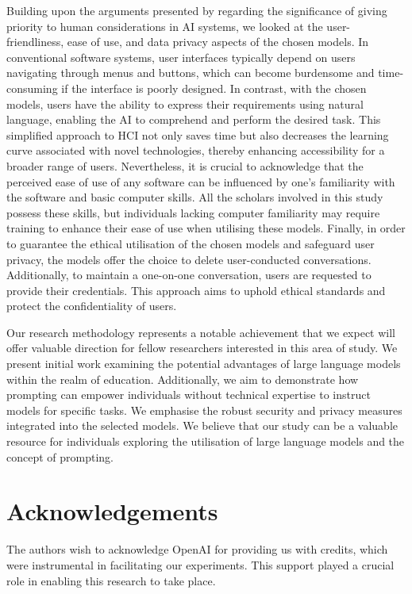 \documentclass{article}
\begin{document}
Building upon the arguments presented by \cite{yang2021human} regarding the significance of giving priority to human considerations in AI systems, we looked at the user-friendliness, ease of use, and data privacy aspects of the chosen models. In conventional software systems, user interfaces typically depend on users navigating through menus and buttons, which can become burdensome and time-consuming if the interface is poorly designed. In contrast, with the chosen models, users have the ability to express their requirements using natural language, enabling the AI to comprehend and perform the desired task. This simplified approach to HCI not only saves time but also decreases the learning curve associated with novel technologies, thereby enhancing accessibility for a broader range of users. Nevertheless, it is crucial to acknowledge that the perceived ease of use of any software can be influenced by one's familiarity with the software and basic computer skills. All the scholars involved in this study possess these skills, but individuals lacking computer familiarity may require training to enhance their ease of use when utilising these models.  Finally, in order to guarantee the ethical utilisation of the chosen models and safeguard user privacy, the models offer the choice to delete user-conducted conversations. Additionally, to maintain a one-on-one conversation, users are requested to provide their credentials. This approach aims to uphold ethical standards and protect the confidentiality of users.

Our research methodology represents a notable achievement that we expect will offer valuable direction for fellow researchers interested in this area of study. We present initial work examining the potential advantages of large language models within the realm of education. Additionally, we aim to demonstrate how prompting can empower individuals without technical expertise to instruct models for specific tasks. We emphasise the robust security and privacy measures integrated into the selected models. We believe that our study can be a valuable resource for individuals exploring the utilisation of large language models and the concept of prompting.

\section{Acknowledgements}
The authors wish to acknowledge OpenAI for providing us with credits, which were instrumental in facilitating our experiments. This support played a crucial role in enabling this research to take place.



\end{document}
